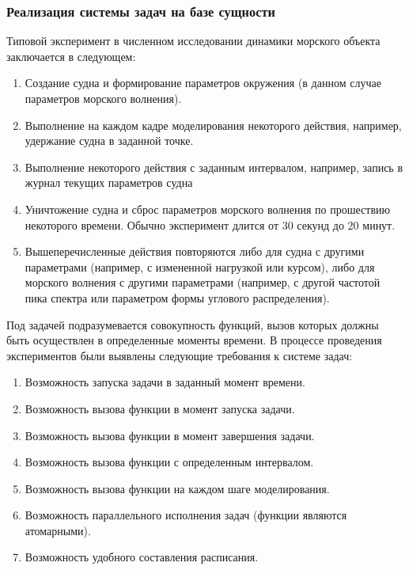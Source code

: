 \subsubsection{Реализация системы задач на базе сущности }
Типовой эксперимент в численном исследовании динамики морского объекта заключается в следующем:
\begin{enumerate}
	\item	Создание судна и формирование параметров окружения 
			(в данном случае параметров морского волнения).
	\item	Выполнение на каждом кадре моделирования некоторого действия, например, удержание судна 
			в заданной точке.
	\item	Выполнение некоторого действия с заданным интервалом, например, запись в журнал текущих							параметров судна
	\item	Уничтожение судна и сброс параметров морского волнения по прошествию некоторого времени. 
			Обычно эксперимент длится от 30 секунд до 20 минут.
	\item	Вышеперечисленные действия повторяются либо для судна с другими параметрами 
			(например, с измененной нагрузкой или курсом), либо для морского волнения с другими параметрами (например, с другой частотой пика спектра или параметром формы углового распределения).
\end{enumerate}

Под задачей подразумевается совокупность функций, вызов которых должны быть осуществлен в определенные моменты времени. В процессе проведения экспериментов были выявлены следующие требования к системе задач:
\begin{enumerate}
	\item Возможность запуска задачи в заданный момент времени.
	\item Возможность вызова функции в момент запуска задачи. 
	\item Возможность вызова функции в момент завершения задачи.
	\item Возможность вызова функции с определенным интервалом.
	\item Возможность вызова функции на каждом шаге моделирования.
	\item Возможность параллельного исполнения задач (функции являются атомарными).
	\item Возможность удобного составления расписания.
\end{enumerate}

